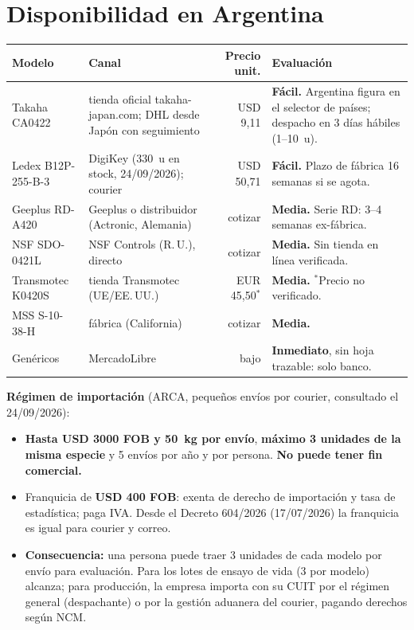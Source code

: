 \documentclass[11pt,a4paper]{article}
\begin{document}
\section{Disponibilidad en Argentina}
\label{sec:argentina}
\begin{table}[H]\centering\footnotesize\setlength{\tabcolsep}{3pt}
\begin{tabular}{l p{3.8cm} r p{6.2cm}}
\toprule
Modelo & Canal & Precio unit. & Evaluación\\
\midrule
Takaha CA0422 & tienda oficial takaha-japan.com; DHL desde Japón con seguimiento & USD 9,11 & \textbf{Fácil.} Argentina figura en el selector de países; despacho en 3 días hábiles (1--10~u).\\
Ledex B12P-255-B-3 & DigiKey (330~u en stock, 24/09/2026); courier & USD 50,71 & \textbf{Fácil.} Plazo de fábrica 16 semanas si se agota.\\
Geeplus RD-A420 & Geeplus o distribuidor (Actronic, Alemania) & cotizar & \textbf{Media.} Serie RD: 3--4 semanas ex-fábrica.\\
NSF SDO-0421L & NSF Controls (R.\,U.), directo & cotizar & \textbf{Media.} Sin tienda en línea verificada.\\
Transmotec K0420S & tienda Transmotec (UE/EE.\,UU.) & EUR 45,50$^{*}$ & \textbf{Media.} $^{*}$Precio no verificado.\\
MSS S-10-38-H & fábrica (California) & cotizar & \textbf{Media.}\\
Genéricos & MercadoLibre & bajo & \textbf{Inmediato}, sin hoja trazable: solo banco.\\
\bottomrule
\end{tabular}
\end{table}

\textbf{Régimen de importación} (ARCA, pequeños envíos por courier, consultado el 24/09/2026):
\begin{itemize}
  \item \textbf{Hasta USD 3000 FOB y 50~kg por envío}, \textbf{máximo 3 unidades de la misma especie} y 5 envíos por
        año y por persona. \textbf{No puede tener fin comercial.}
  \item Franquicia de \textbf{USD 400 FOB}: exenta de derecho de importación y tasa de estadística; paga IVA. Desde
        el Decreto 604/2026 (17/07/2026) la franquicia es igual para courier y correo.
  \item \textbf{Consecuencia:} una persona puede traer 3 unidades de cada modelo por envío para evaluación. Para los
        lotes de ensayo de vida (3 por modelo) alcanza; para producción, la empresa importa con su CUIT por el
        régimen general (despachante) o por la gestión aduanera del courier, pagando derechos según NCM.
\end{itemize}
\end{document}

